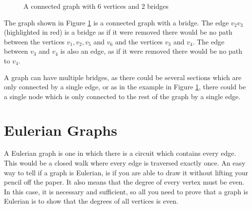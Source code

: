 \begin{minipage}[c]{0.45\linewidth}
  \begin{figure}[H]
    \centering
    \usetikzlibrary{graphs}
    \caption{A connected graph with 6 vertices and 2 bridges}
    \label{fig:bridgegraph1}
  \end{figure}
\end{minipage}\hfill
\begin{minipage}[c]{0.45\linewidth}
The graph shown in Figure \ref*{fig:bridgegraph1} is a connected graph with a bridge. The edge $v_2v_3$ (highlighted in
 red) is a bridge as if it were removed there would be no path between the vertices $v_1, v_2, v_5$ and $v_6$ and the
 vertices $v_3$ and $v_4$. The edge between $v_3$ and $v_4$ is also an edge, as if it were removed there would be no
 path to $v_4$.
\end{minipage}

A graph can have multiple bridges, as there could be several sections which are only connected by a single edge, or as
 in the example in Figure \ref*{fig:bridgegraph1}, there could be a single node which is only connected to the rest of
 the graph by a single edge.

\section*{Eulerian Graphs}

A Eulerian graph is one in which there is a circuit which contains every edge. This would be a closed walk where every
 edge is traversed exactly once. An easy way to tell if a graph is Eulerian, is if you are able to draw it without
 lifting your pencil off the paper. It also means that the degree of every vertex must be even. In this case, it is
 necessary and sufficient, so all you need to prove that a graph is Eulerian is to show that the degrees of all vertices
 is even.

